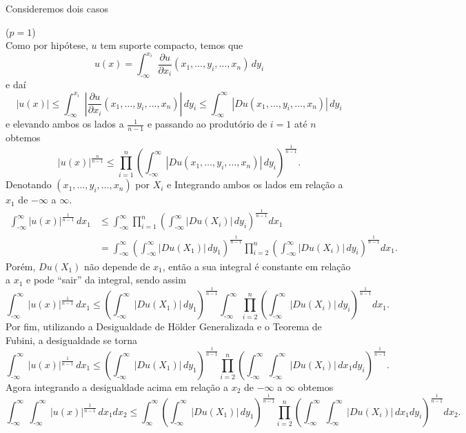 \documentclass[a4paper, 11pt]{book}
\theoremstyle{definition}
\newcommand{\m}{\text{-}}
\begin{document}
\begin{prf}
    Consideremos dois casos

    ($p = 1$)\\
    Como por hipótese, $u$ tem suporte compacto, temos que
    \[
        u(x) = \int_{\m\infty}^{x_i} \dfrac{\partial u}{\partial x_i}(x_1,\dots,y_i,\dots,x_n) \, dy_i
    \]
    e daí
    \[
        |u(x)| \leqslant \int_{\m\infty}^{x_i} \left|\dfrac{\partial u}{\partial x_i}(x_1,\dots,y_i,\dots,x_n)\right| \, dy_i  \leqslant \int_{\m\infty}^{\infty} \left| Du(x_1,\dots,y_i,\dots,x_n) \right| \,dy_i
    \]
    e elevando ambos os lados a $\frac{1}{n-1}$ e passando ao produtório de $i = 1$ até $n$ obtemos
    \[
        |u(x)|^{\frac{n}{n-1}} \leqslant \prod_{i=1}^n \left( \int_{\m\infty}^{\infty} |Du(x_1,\dots,y_i,\dots,x_n)| \,dy_i \right)^{\frac{1}{n-1}}.
    \]
    Denotando $(x_1,\dots,y_i,\dots,x_n)$ por $X_i$ e  Integrando ambos os lados em relação a $x_1$ de $-\infty$ a $\infty$.
    \[
        \begin{aligned}
            \int_{\m\infty}^{\infty} |u(x)|^{\frac{1}{n-1}} \,dx_1 &\leqslant \int_{\m\infty}^{\infty} \prod_{i=1}^n \left( \int_{\m\infty}^{\infty} |Du(X_i)| \,dy_i \right)^{\frac{1}{n-1}}  dx_1\\ 
            &= \int_{\m\infty}^{\infty} \left( \int_{\m\infty}^{\infty} |Du(X_1)| \,dy_1 \right)^{\frac{1}{n-1}}  \prod_{i=2}^n \left(\int_{\m\infty}^{\infty} |Du(X_i)| \, dy_i\right)^{\frac{1}{n-1}} dx_1.
        \end{aligned}
    \]
    Porém, $Du(X_1)$ não depende de $x_1$, então a sua integral é constante em relação a $x_1$ e pode ``sair'' da integral, sendo assim
    \[
        \int_{\m\infty}^{\infty} |u(x)|^{\frac{1}{n-1}} \,dx_1 \leqslant \left( \int_{\m\infty}^{\infty} |Du(X_1)| \,dy_1 \right)^{\frac{1}{n-1}}\int_{\m\infty}^{\infty}   \prod_{i=2}^n \left(\int_{\m\infty}^{\infty} |Du(X_i)| \, dy_i\right)^{\frac{1}{n-1}} dx_1.
    \]
    Por fim, utilizando a Desigualdade de Hölder Generalizada e o Teorema de Fubini, a desigualdade se torna
    \[
        \int_{\m\infty}^{\infty} |u(x)|^{\frac{1}{n-1}} \,dx_1 \leqslant \left( \int_{\m\infty}^{\infty} |Du(X_1)| \,dy_1 \right)^{\frac{1}{n-1}}\prod_{i=2}^n \left(\int_{\m\infty}^{\infty}   \int_{\m\infty}^{\infty} |Du(X_i)| \, dx_1dy_i\right)^{\frac{1}{n-1}}.
    \]
    Agora integrando a desigualdade acima em relação a $x_2$ de $-\infty$ a $\infty$ obtemos
    \[
        \int_{\m\infty}^{\infty}\int_{\m\infty}^{\infty} |u(x)|^{\frac{1}{n-1}} \,dx_1dx_2 \leqslant \int_{\infty}^{\infty}\!\!\left( \int_{\m\infty}^{\infty} |Du(X_1)| \,dy_1 \right)^{\frac{1}{n-1}}\prod_{i=2}^n \left(\int_{\m\infty}^{\infty} \!\int_{\m\infty}^{\infty} |Du(X_i)| \, dx_1dy_i\right)^{\frac{1}{n-1}} \!dx_2.
\]
\end{prf}
\end{document}
